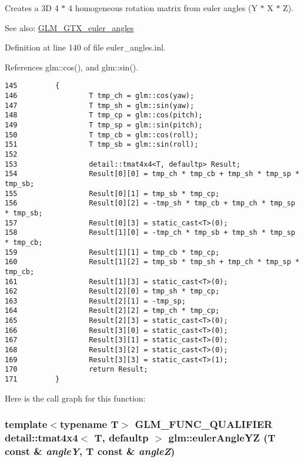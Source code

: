 Creates a 3D 4 $\ast$ 4 homogeneous rotation matrix from euler angles (Y $\ast$ X $\ast$ Z). \begin{Desc}
\item[See also:]\hyperlink{group__gtx__euler__angles}{GLM\_\-GTX\_\-euler\_\-angles} \end{Desc}


Definition at line 140 of file euler\_\-angles.inl.

References glm::cos(), and glm::sin().

\begin{Code}\begin{verbatim}145         {
146                 T tmp_ch = glm::cos(yaw);
147                 T tmp_sh = glm::sin(yaw);
148                 T tmp_cp = glm::cos(pitch);
149                 T tmp_sp = glm::sin(pitch);
150                 T tmp_cb = glm::cos(roll);
151                 T tmp_sb = glm::sin(roll);
152 
153                 detail::tmat4x4<T, defaultp> Result;
154                 Result[0][0] = tmp_ch * tmp_cb + tmp_sh * tmp_sp * tmp_sb;
155                 Result[0][1] = tmp_sb * tmp_cp;
156                 Result[0][2] = -tmp_sh * tmp_cb + tmp_ch * tmp_sp * tmp_sb;
157                 Result[0][3] = static_cast<T>(0);
158                 Result[1][0] = -tmp_ch * tmp_sb + tmp_sh * tmp_sp * tmp_cb;
159                 Result[1][1] = tmp_cb * tmp_cp;
160                 Result[1][2] = tmp_sb * tmp_sh + tmp_ch * tmp_sp * tmp_cb;
161                 Result[1][3] = static_cast<T>(0);
162                 Result[2][0] = tmp_sh * tmp_cp;
163                 Result[2][1] = -tmp_sp;
164                 Result[2][2] = tmp_ch * tmp_cp;
165                 Result[2][3] = static_cast<T>(0);
166                 Result[3][0] = static_cast<T>(0);
167                 Result[3][1] = static_cast<T>(0);
168                 Result[3][2] = static_cast<T>(0);
169                 Result[3][3] = static_cast<T>(1);
170                 return Result;
171         }
\end{verbatim}
\end{Code}




Here is the call graph for this function:\hypertarget{group__gtx__euler__angles_g9ac024a16439421d2a3c7c17b6df31b5}{
\subsubsection[eulerAngleYZ]{\setlength{\rightskip}{0pt plus 5cm}template$<$typename T$>$ GLM\_\-FUNC\_\-QUALIFIER detail::tmat4x4$<$ T, defaultp $>$ glm::eulerAngleYZ (T const \& {\em angleY}, \/  T const \& {\em angleZ})}}
\label{group__gtx__euler__angles_g9ac024a16439421d2a3c7c17b6df31b5}


